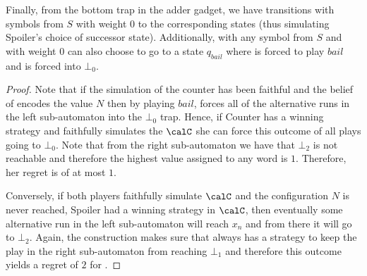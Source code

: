 \documentclass[a4paper]{article}
\begin{document}
Finally, from the bottom trap in the adder gadget, we have transitions
with symbols from $S$ with weight $0$ to the corresponding states (thus
simulating Spoiler's choice of successor state). Additionally, with any
symbol from $S$ and with weight $0$ \eve can also choose to go to a
state $q_{bail}$ where \adam is forced to play $bail$ and \eve is
forced into $\bot_0$.
	
\begin{proof}
	Note that if the simulation of the counter has
	been faithful and the belief of \eve encodes the value $N$ then by
	playing $bail$, \adam forces all of the alternative runs in the
	left sub-automaton into the $\bot_0$ trap. Hence, if Counter has a winning
	strategy and \eve faithfully simulates the $\calC$ she can force this
	outcome of all plays going to $\bot_0$. Note that from the right
	sub-automaton we have that $\bot_2$ is not reachable and therefore the
	highest value assigned to any word is $1$. Therefore, her regret is of
	at most $1$.

	Conversely, if both players faithfully simulate $\calC$ and the
	configuration $N$ is never reached, \ie Spoiler had a winning strategy
	in $\calC$, then eventually some alternative run in the left
	sub-automaton
	will reach $x_n$ and from there it will go to $\bot_2$. Again, the
	construction makes sure that \adam always has a strategy to keep the
	play in the right sub-automaton from reaching $\bot_1$ and therefore this
	outcome yields a regret of $2$ for \eve.
\end{proof}
\end{document}
